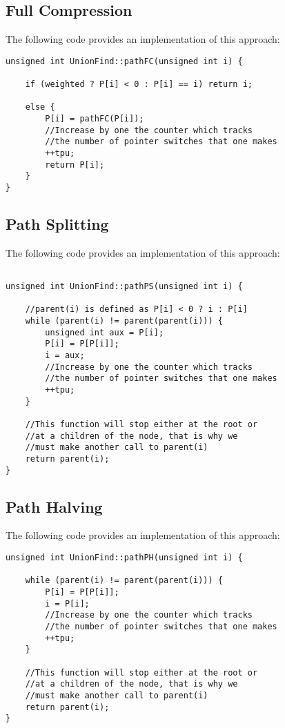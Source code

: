 \subsection{Full Compression}
The following code provides an implementation of this approach:

\begin{verbatim}
unsigned int UnionFind::pathFC(unsigned int i) {

    if (weighted ? P[i] < 0 : P[i] == i) return i;

    else {
        P[i] = pathFC(P[i]);
        //Increase by one the counter which tracks 
        //the number of pointer switches that one makes
        ++tpu;
        return P[i];
    }
}
\end{verbatim}

\subsection{Path Splitting}
The following code provides an implementation of this approach:

\begin{verbatim}

unsigned int UnionFind::pathPS(unsigned int i) {

    //parent(i) is defined as P[i] < 0 ? i : P[i]
    while (parent(i) != parent(parent(i))) {
        unsigned int aux = P[i];
        P[i] = P[P[i]];
        i = aux;
        //Increase by one the counter which tracks 
        //the number of pointer switches that one makes
        ++tpu;
    }

    //This function will stop either at the root or
    //at a children of the node, that is why we 
    //must make another call to parent(i)
    return parent(i);
}
\end{verbatim}


\subsection{Path Halving}
The following code provides an implementation of this approach:

\begin{verbatim}
unsigned int UnionFind::pathPH(unsigned int i) {

    while (parent(i) != parent(parent(i))) {
        P[i] = P[P[i]];
        i = P[i];
        //Increase by one the counter which tracks 
        //the number of pointer switches that one makes
        ++tpu;
    }

    //This function will stop either at the root or
    //at a children of the node, that is why we 
    //must make another call to parent(i)
    return parent(i);
}
\end{verbatim}

